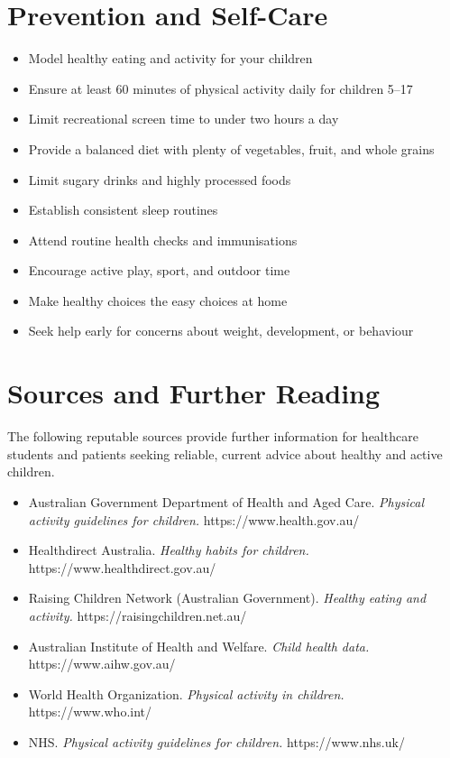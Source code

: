 \section*{Prevention and Self-Care}
\begin{itemize}
    \item Model healthy eating and activity for your children
    \item Ensure at least 60 minutes of physical activity daily for children 5--17
    \item Limit recreational screen time to under two hours a day
    \item Provide a balanced diet with plenty of vegetables, fruit, and whole grains
    \item Limit sugary drinks and highly processed foods
    \item Establish consistent sleep routines
    \item Attend routine health checks and immunisations
    \item Encourage active play, sport, and outdoor time
    \item Make healthy choices the easy choices at home
    \item Seek help early for concerns about weight, development, or behaviour
\end{itemize}

\section*{Sources and Further Reading}
The following reputable sources provide further information for healthcare students and patients seeking reliable, current advice about healthy and active children.

\begin{itemize}
    \item Australian Government Department of Health and Aged Care. \textit{Physical activity guidelines for children.} https://www.health.gov.au/
    \item Healthdirect Australia. \textit{Healthy habits for children.} https://www.healthdirect.gov.au/
    \item Raising Children Network (Australian Government). \textit{Healthy eating and activity.} https://raisingchildren.net.au/
    \item Australian Institute of Health and Welfare. \textit{Child health data.} https://www.aihw.gov.au/
    \item World Health Organization. \textit{Physical activity in children.} https://www.who.int/
    \item NHS. \textit{Physical activity guidelines for children.} https://www.nhs.uk/
\end{itemize}
